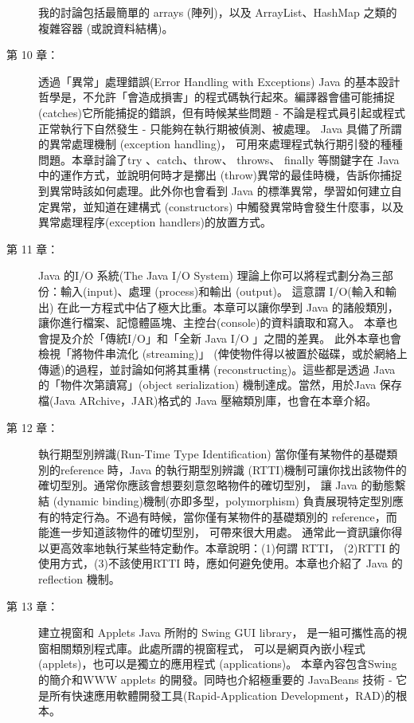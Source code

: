 \begin{description}
我的討論包括最簡單的 arrays (陣列)，以及 ArrayList、HashMap 之類的複雜容器
(或說資料結構)。
\item [第 10 章：] 透過「異常」處理錯誤(Error Handling with Exceptions) 
Java 的基本設計哲學是，不允許「會造成損害」的程式碼執行起來。編譯器會儘可能捕捉
(catches)它所能捕捉的錯誤，但有時候某些問題 -
不論是程式員引起或程式正常執行下自然發生 - 只能夠在執行期被偵測、被處理。
Java 具備了所謂的異常處理機制 (exception handling)，
可用來處理程式執行期引發的種種問題。本章討論了try 、catch、throw、 throws、
finally 等關鍵字在 Java 中的運作方式，並說明何時才是擲出
(throw)異常的最佳時機，告訴你捕捉到異常時該如何處理。此外你也會看到
Java 的標準異常，學習如何建立自定異常，並知道在建構式 (constructors)
中觸發異常時會發生什麼事，以及異常處理程序(exception handlers)的放置方式。

\item [第 11 章：] Java 的I/O 系統(The Java I/O System)
理論上你可以將程式劃分為三部份：輸入(input)、處理 (process)和輸出 (output)。
這意謂 I/O(輸入和輸出) 在此一方程式中佔了極大比重。本章可以讓你學到
Java 的諸般類別，讓你進行檔案、記憶體區塊、主控台(console)的資料讀取和寫入。
本章也會提及介於「傳統I/O」和「全新 Java I/O 」之間的差異。
此外本章也會檢視「將物件串流化 (streaming)」
(俾使物件得以被置於磁碟，或於網絡上傳遞)的過程，並討論如何將其重構
(reconstructing)。這些都是透過 Java 的「物件次第讀寫」(object serialization)
機制達成。當然，用於Java 保存檔(Java ARchive，JAR)格式的
Java 壓縮類別庫，也會在本章介紹。
\item [第 12 章：] 執行期型別辨識(Run-Time Type Identification)
當你僅有某物件的基礎類別的reference 時，Java 的執行期型別辨識
(RTTI)機制可讓你找出該物件的確切型別。通常你應該會想要刻意忽略物件的確切型別，
讓 Java 的動態繫結 (dynamic binding)機制(亦即多型，polymorphism)
負責展現特定型別應有的特定行為。不過有時候，當你僅有某物件的基礎類別的
reference，而能進一步知道該物件的確切型別， 可帶來很大用處。
通常此一資訊讓你得以更高效率地執行某些特定動作。本章說明：(1)何謂 RTTI，
(2)RTTI 的使用方式，(3)不該使用RTTI 時，應如何避免使用。本章也介紹了 Java 的
reflection 機制。
\item [第 13 章：] 建立視窗和 Applets Java 所附的 Swing GUI library，
是一組可攜性高的視窗相關類別程式庫。此處所謂的視窗程式，
可以是網頁內嵌小程式 (applets)，也可以是獨立的應用程式 (applications)。
本章內容包含Swing 的簡介和WWW applets 的開發。同時也介紹極重要的 JavaBeans
技術 - 它是所有快速應用軟體開發工具(Rapid-Application Development，RAD)的根本。


\end{description}

